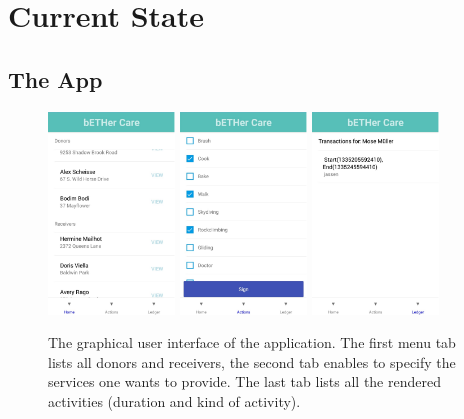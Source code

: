 \documentclass[12pt]{report}
\begin{document}
\section{Current State}

\subsection{The App}

\begin{figure}[!ht]
	\centering
	\includegraphics[width=0.3\textwidth]{App_Home.pdf}
	\quad
	\includegraphics[width=0.3\textwidth]{App_Actions.pdf}
	\quad
	\includegraphics[width=0.3\textwidth]{App_Ledger.pdf}
	\caption{The graphical user interface of the application. The first menu tab lists all donors and receivers, the second tab enables to specify the services one wants to provide. The last tab lists all the rendered activities (duration and kind of activity).}
	\label{Application}
\end{figure}
\end{document}
